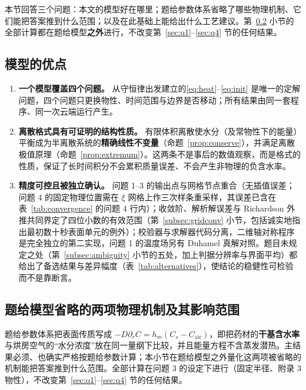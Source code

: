 \label{sec:evaluation}

本节回答三个问题：本文的模型好在哪里；题给参数体系省略了哪些物理机制、它们能把答案推到什么范围；以及在此基础上能给出什么工艺建议。第~\ref{subsec:extension} 小节的全部计算都在题给模型\textbf{之外}进行，不改变第~\ref{sec:q1}--\ref{sec:q4} 节的任何结果。

\subsection{模型的优点}
\begin{enumerate}[leftmargin=*,itemsep=0.2em]
  \item \textbf{一个模型覆盖四个问题。} 从守恒律出发建立的\eqref{eq:heat}--\eqref{eq:init} 是唯一的定解问题，四个问题只更换物性、时间范围与边界是否移动；所有结果由同一套程序、同一次云端运行产生。
  \item \textbf{离散格式具有可证明的结构性质。} 有限体积离散使水分（及常物性下的能量）平衡成为半离散系统的\textbf{精确线性不变量}（命题~\ref{prop:conserve}），并满足离散极值原理（命题~\ref{prop:extremum}）。这两条不是事后的数值观察，而是格式的性质，保证了长时间积分不会累积质量误差、不会产生非物理的负含水率。
  \item \textbf{精度可控且被独立确认。} 问题 1--3 的输出点与网格节点重合（无插值误差；问题 4 的固定物理位置需在 $\xi$ 网格上作三次样条重采样，其误差已含在表~\ref{tab:convergence} 的问题 4 行内）；收敛阶、解析解误差与 Richardson 外推共同界定了四位小数的有效范围（第~\ref{subsec:gridconv} 小节，包括诚实地指出最初数十秒表面单元的例外）；校验器与求解器代码分离，二维轴对称程序是完全独立的第二实现，问题 1 的温度场另有 Duhamel 真解对照。题目未规定之处（第~\ref{subsec:ambiguity} 小节的五处，加上判据分辨率与界面平均）都给出了备选结果与差异幅度（表~\ref{tab:alternatives}），使结论的稳健性可检验而不是靠断言。
\end{enumerate}

\subsection{题给模型省略的两项物理机制及其影响范围}
\label{subsec:extension}

题给参数体系把表面传质写成 $-D\partial_rC=h_m(C_s-C_{\mathrm{air}})$，即把药材的\textbf{干基含水率}与烘房空气的“水分浓度”放在同一量纲下比较，并且能量方程不含蒸发潜热。主结果必须、也确实严格按题给参数计算；本小节在题给模型之外量化这两项被省略的机制能把答案推到什么范围。全部计算在问题 3 的设定下进行（固定半径、附录 3 物性），不改变第~\ref{sec:q1}--\ref{sec:q4} 节的任何结果。

